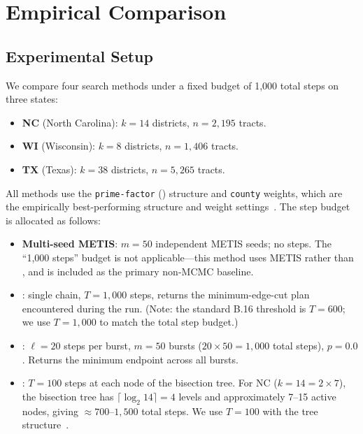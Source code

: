 \section{Empirical Comparison}
\label{sec:comparison}

\subsection{Experimental Setup}

We compare four search methods under a fixed budget of 1{,}000 total
\recom{} steps on three states:

\begin{itemize}
\item \textbf{NC} (North Carolina): $k = 14$ districts, $n = 2{,}195$ tracts.
\item \textbf{WI} (Wisconsin): $k = 8$ districts, $n = 1{,}406$ tracts.
\item \textbf{TX} (Texas): $k = 38$ districts, $n = 5{,}265$ tracts.
\end{itemize}

All methods use the \texttt{prime-factor} (\ar{}) structure and
\texttt{county} weights, which are the empirically best-performing
structure and weight settings~\citep{b11paper}.
The step budget is allocated as follows:

\begin{itemize}
\item \textbf{Multi-seed METIS}: $m = 50$ independent METIS seeds;
      no \recom{} steps.
      The ``1{,}000 steps'' budget is not applicable---this method
      uses METIS rather than \recom{}, and is included as the primary
      non-MCMC baseline.

\item \textbf{\cs{}}: single \recom{} chain, $T = 1{,}000$ steps,
      returns the minimum-edge-cut plan encountered during the run.
      (Note: the standard B.16 threshold is $T = 600$; we use $T = 1{,}000$
      to match the total step budget.)

\item \textbf{\shb{}}: $\ell = 20$ steps per burst, $m = 50$ bursts
      ($20 \times 50 = 1{,}000$ total steps), $p = 0.0$.
      Returns the minimum endpoint across all bursts.

\item \textbf{\be{}}: $T = 100$ steps at each node of the \ar{}
      bisection tree.
      For NC ($k = 14 = 2 \times 7$), the bisection tree has
      $\lceil \log_2 14 \rceil = 4$ levels and approximately 7--15
      active nodes, giving $\approx 700$--$1{,}500$ total steps.
      We use $T = 100$ with the \ar{} tree structure~\citep{h1paper}.
\end{itemize}


